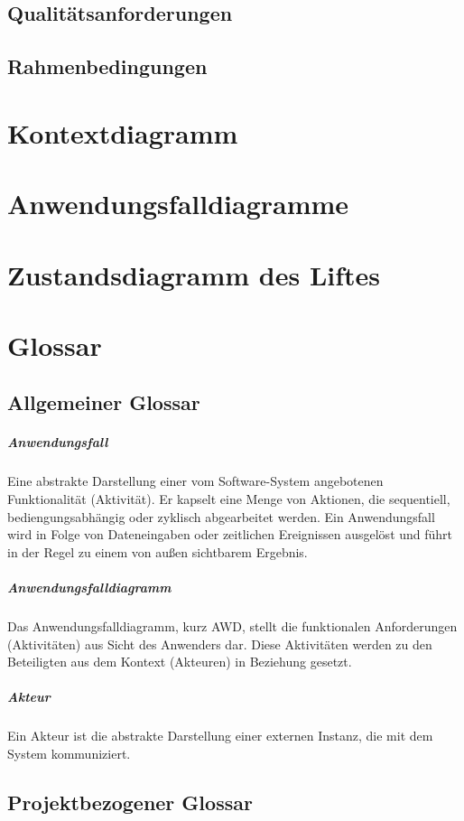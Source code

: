 \section{Qualitätsanforderungen}

\section{Rahmenbedingungen}

\chapter{Kontextdiagramm}

\chapter{Anwendungsfalldiagramme}

\chapter{Zustandsdiagramm des Liftes}

\chapter{Glossar}

\section{Allgemeiner Glossar}
\paragraph{Anwendungsfall}
Eine abstrakte Darstellung einer vom Software-System angebotenen Funktionalität (Aktivität). Er kapselt eine Menge von Aktionen, die sequentiell, bediengungsabhängig oder zyklisch abgearbeitet werden. Ein Anwendungsfall wird in Folge von Dateneingaben oder zeitlichen Ereignissen ausgelöst und führt in der Regel zu einem von au{\ss}en sichtbarem Ergebnis.

\paragraph{Anwendungsfalldiagramm}
Das Anwendungsfalldiagramm, kurz AWD, stellt die funktionalen Anforderungen (Aktivitäten) aus Sicht des Anwenders dar. Diese Aktivitäten werden zu den Beteiligten aus dem Kontext (Akteuren) in Beziehung gesetzt.

\paragraph{Akteur}
Ein Akteur ist die abstrakte Darstellung einer externen Instanz, die mit dem System kommuniziert.

\section{Projektbezogener Glossar}


